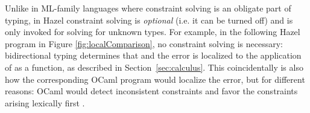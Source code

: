 



Unlike in ML-family languages where constraint solving is an obligate part of typing, in Hazel constraint solving is \emph{optional} (i.e. it can be turned off) and is only invoked for solving for unknown types. For example, in the following Hazel program in Figure \ref{fig:localComparison}, no constraint solving is necessary: bidirectional typing determines that  and the error is localized to the application of  as a function, as described in Section~\ref{sec:calculus}. This coincidentally is also how the corresponding OCaml program would localize the error, but for different reasons: OCaml would detect inconsistent constraints and favor the constraints arising lexically first \cite{mcadam1998unification,DBLP:journals/tapos/OderskySW99,DBLP:conf/icfp/Pottier14}.

